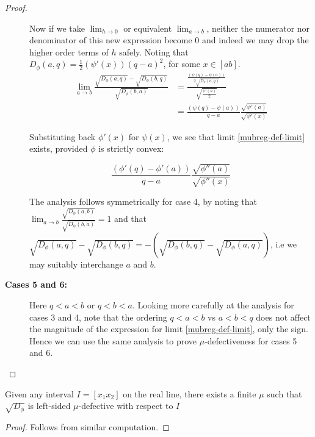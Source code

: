 \documentclass[11pt]{myclass}
\newcommand{\breg}{\ensuremath{D_\phi}}
\begin{document}
\begin{proof}
\begin{description}
Now if we take $\lim_{h \to 0}$ or equivalent $\lim_{a \to b}$, neither the numerator nor denominator of this
new expression become $0$ and indeed we may drop the higher order terms of $h$ safely.  Noting that $\breg(a,q) = \frac{1}{2}(\psi'(x))(q-a)^2$, for some $x \in [ab]$. 
\begin{align*}
\lim_{a \to b} \frac{\sqrt{\breg(a,q)} - \sqrt{\breg(b,q)}}{\sqrt{\breg(b,a)}} 
&= \frac{ 
                       \frac{(\psi(q) - \psi(a))}{2 \sqrt{\breg(a,q)}}  }
        {  \sqrt{\frac{\psi'(a)}{2}} } 
\\ &= \frac{(\psi(q) - \psi(a))}{q - a}\frac{\sqrt{\psi'(a)}}{\sqrt{ \psi'(x)}} 
\end{align*}

Substituting back $\phi'(x)$ for $\psi(x)$, we see that limit \ref{mubreg-def-limit} exists, provided $\phi$ is strictly convex:

\begin{equation}
 \frac{(\phi'(q) - \phi'(a))}{q - a}\frac{\sqrt{\phi''(a)}}{\sqrt{ \phi''(x)}} 
\end{equation}

The analysis follows symmetrically for case 4, by noting that $\lim_{a \to b} \frac{\sqrt{\breg (a,b)}}{\sqrt{\breg(b,a)}} = 1$ and that $\sqrt{\breg(a,q)} - \sqrt{\breg(b,q)}  = - (\sqrt{\breg(b,q)} - \sqrt{\breg(a,q)})$, i.e we may suitably interchange $a$ and $b$.

\item[\textbf{Cases 5 and 6:}]
Here $q<a<b$ or $q<b<a$. Looking more carefully at the analysis for cases 3 and 4, note that the ordering $q<a<b$ vs $a<b<q$ does not affect the magnitude of the expression for limit  \ref{mubreg-def-limit}, only the sign. Hence we can use the same analysis to prove $\mu$-defectiveness for cases 5 and 6.
\qedhere
\end{description}
\end{proof}

\begin{corollary}
 Given any interval $I=[x_1 x_2]$ on the real line, there exists a finite 
$\mu$ such that  $\sqrt{\breg}$ is left-sided $\mu$-defective with respect to $I$ 
\end{corollary}

\begin{proof}
Follows from similar computation. 
\end{proof}
\end{document}
